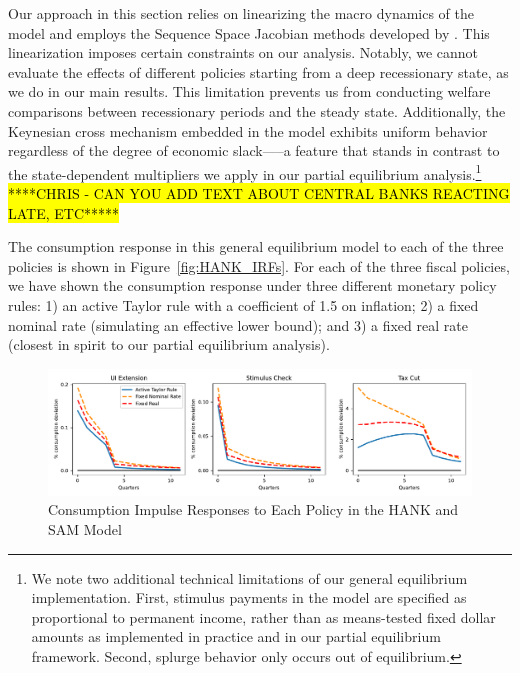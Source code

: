 \documentclass[\econtexRoot/HAFiscal]{subfiles}
\begin{document}
Our approach in this section relies on linearizing the macro dynamics of the model and employs the Sequence Space Jacobian methods developed by \cite{Auclert2021}. This linearization imposes certain constraints on our analysis. Notably, we cannot evaluate the effects of different policies starting from a deep recessionary state, as we do in our main results. This limitation prevents us from conducting welfare comparisons between recessionary periods and the steady state. Additionally, the Keynesian cross mechanism embedded in the model exhibits uniform behavior regardless of the degree of economic slack—--a feature that stands in contrast to the state-dependent multipliers we apply in our partial equilibrium analysis.\footnote{We note two additional technical limitations of our general equilibrium implementation. First, stimulus payments in the model are specified as proportional to permanent income, rather than as means-tested fixed dollar amounts as implemented in practice and in our partial equilibrium framework. Second, splurge behavior only occurs out of equilibrium.} \hl{****CHRIS - CAN YOU ADD TEXT ABOUT CENTRAL BANKS REACTING LATE, ETC*****} %



The consumption response in this general equilibrium model to each of the three policies is shown in Figure~\ref{fig:HANK_IRFs}. For each of the three fiscal policies, we have shown the consumption response under three different monetary policy rules: 1) an active Taylor rule with a coefficient of 1.5 on inflation; 2) a fixed nominal rate (simulating an effective lower bound); and 3) a fixed real rate (closest in spirit to our partial equilibrium analysis).


\begin{figure}[th]
	\begin{center}
		\includegraphics[width=.9\textwidth]{../Figures/HANK_IRFs_w_splurge.pdf}
		\caption{Consumption Impulse Responses to Each Policy in the HANK and SAM Model}
		\notinsubfile{\label{fig:HANK_IRFs}}
	\end{center}
\end{figure}
\end{document}
